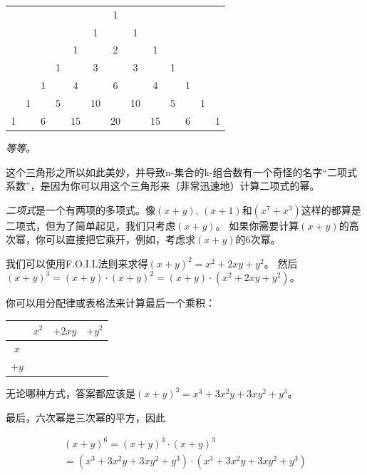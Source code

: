 \begin{center}
\begin{tabular}{ccccccccccccc}
  &   &   &   &    &    & 1  &    &    &   &   &   &   \\
  &   &   &   &    & 1  &    & 1  &    &   &   &   &   \\
  &   &   &   &  1 &    & 2  &    & 1  &   &   &   &   \\
  &   &   & 1 &    & 3  &    & 3  &    & 1 &   &   &   \\
  &   & 1 &   &  4 &    & 6  &    & 4  &   & 1 &   &   \\
  & 1 &   & 5 &    & 10 &    & 10 &    & 5 &   & 1 &   \\
1 &   & 6 &   & 15 &    & 20 &    & 15 &   & 6 &   & 1 \\
\end{tabular}
\end{center}

\noindent \emph{等等。}

这个三角形之所以如此美妙，并导致n-集合的k-组合数有一个奇怪的名字“二项式系数”，是因为你可以用这个三角形来（非常迅速地）计算二项式的幂。

\emph{二项式}是一个有两项的多项式。像$(x+y)$, $(x+1)$和$(x^7+x^3)$这样的都算是二项式，但为了简单起见，我们只考虑$(x+y)$。
如果你需要计算$(x+y)$的高次幂，你可以直接把它乘开，例如，考虑求$(x+y)$的6次幂。

我们可以使用F.O.I.L法则来求得$(x+y)^2 = x^2 + 2xy + y^2$。
然后$(x+y)^3 = (x+y) \cdot (x+y)^2 = (x+y) \cdot (x^2 + 2xy + y^2)$。

你可以用分配律或表格法来计算最后一个乘积：

\begin{center}
\begin{tabular}{c|ccc}
      & $x^2$ & $+ 2xy$ & $+ y^2$ \\ \hline
$x$   &       &         &         \\
$+ y$ &       &         &         \\
\end{tabular} 
\end{center}

无论哪种方式，答案都应该是$(x+y)^3 = x^3 + 3x^2y + 3xy^2 + y^3$。

最后，六次幂是三次幂的平方，因此

\begin{gather*} 
(x+y)^6 = (x+y)^3 \cdot (x+y)^3 \\
= (x^3 + 3x^2y + 3xy^2 + y^3) \cdot (x^3 + 3x^2y + 3xy^2 + y^3)
\end{gather*}

